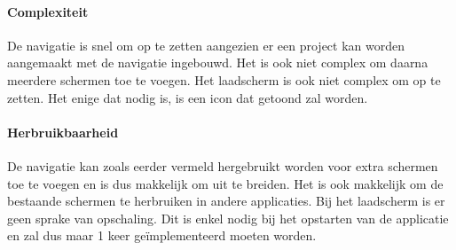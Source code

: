 \paragraph{Complexiteit}
De navigatie is snel om op te zetten aangezien er een project kan worden aangemaakt met de navigatie ingebouwd.
Het is ook niet complex om daarna meerdere schermen toe te voegen. 
Het laadscherm is ook niet complex om op te zetten. Het enige dat nodig is, is een icon dat getoond zal worden.

\paragraph{Herbruikbaarheid}
De navigatie kan zoals eerder vermeld hergebruikt worden voor extra schermen toe te voegen en is dus makkelijk 
om uit te breiden. Het is ook makkelijk om de bestaande schermen te herbruiken in andere applicaties. 
Bij het laadscherm is er geen sprake van opschaling. Dit is enkel nodig bij het opstarten 
van de applicatie en zal dus maar 1 keer geïmplementeerd moeten worden.
